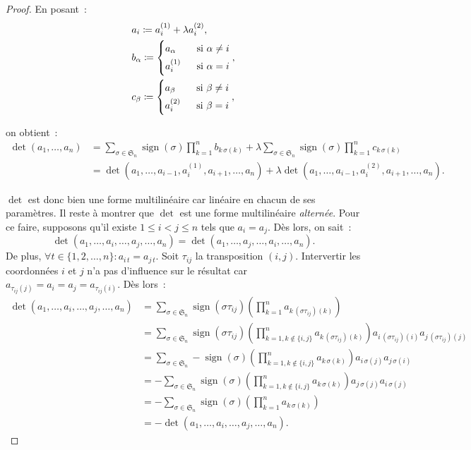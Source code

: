 \documentclass{article}
\DeclareMathOperator{\sign}{sign}
\newcommand{\Perm}{\mathfrak{S}}
\theoremstyle{definition}
\theoremstyle{remark}
\begin{document}
\begin{proof}
		En posant~:
		\[\begin{aligned}
			&a_i \coloneqq a_i^{(1)} + \lambda a_i^{(2)}, \\
			&b_\alpha \coloneqq \begin{dcases}a_\alpha \; &\text{ si } \alpha \neq i\\a_i^{(1)} \; &\text{ si } \alpha = i\end{dcases}, \\
			&c_\beta  \coloneqq \begin{dcases}a_\beta  \; &\text{ si } \beta  \neq i\\a_i^{(2)} \; &\text{ si } \beta  = i\end{dcases},
		\end{aligned}\]

		on obtient~:
		\[\begin{aligned}
			\det(a_1, \ldots, a_n) &= \sum_{\sigma\in\Perm_n}\sign(\sigma)\prod_{k=1}^nb_{k\,\sigma(k)} + \lambda\sum_{\sigma\in\Perm_n}\sign(\sigma)\prod_{k=1}^nc_{k\,\sigma(k)} \\
			                       &= \det(a_1, \ldots, a_{i-1}, a_i^{(1)}, a_{i+1}, \ldots, a_n) + \lambda\det(a_1, \ldots, a_{i-1}, a_i^{(2)}, a_{i+1}, \ldots, a_n).
		\end{aligned}\]

		$\det$ est donc bien une forme multilinéaire car linéaire en chacun de ses paramètres. Il reste à montrer que $\det$ est une forme multilinéaire \textit{alternée}.
		Pour ce faire, supposons qu'il existe $1 \leq i < j \leq n$ tels que $a_i = a_j$. Dès lors, on sait~:
		\[\det(a_1, \ldots, a_i, \ldots, a_j, \ldots, a_n) = \det(a_1, \ldots, a_j, \ldots, a_i, \ldots, a_n).\]
		De plus, $\forall t \in \{1, 2, \ldots, n\} : a_{i\,t} = a_{j\,t}$. Soit $\tau_{ij}$ la transposition $(i, j)$. Intervertir les coordonnées $i$ et $j$ n'a pas d'influence
		sur le résultat car $a_{\tau_{ij}(j)} = a_i = a_j = a_{\tau_{ij}(i)}$. Dès lors~:
		\[\begin{aligned}
			\det(a_1, \ldots, a_i, \ldots, a_j, \ldots, a_n) &= \sum_{\sigma \in \Perm_n}\sign(\sigma\tau_{ij})\left(\prod_{k=1}^na_{k\,(\sigma\tau_{ij})(k)}\right) \\
				&= \sum_{\sigma\in\Perm_n}\sign(\sigma\tau_{ij})\left(\prod_{k=1, k \not \in \{i, j\}}^na_{k\,(\sigma\tau_{ij})(k)}\right)a_{i\,(\sigma\tau_{ij})(i)}a_{j\,(\sigma\tau_{ij})(j)} \\
				&= \sum_{\sigma\in\Perm_n}-\sign(\sigma)\left(\prod_{k=1, k\not\in\{i, j\}}^na_{k\,\sigma(k)}\right)a_{i\,\sigma(j)}a_{j\,\sigma(i)} \\
				&= -\sum_{\sigma\in\Perm_n}\sign(\sigma)\left(\prod_{k=1, k\not\in\{i, j\}}^na_{k\,\sigma(k)}\right)a_{j\,\sigma(j)}a_{i\,\sigma(j)} \\
				&= -\sum_{\sigma\in\Perm_n}\sign(\sigma)\left(\prod_{k=1}^na_{k\,\sigma(k)}\right) \\
				&= -\det(a_1, \ldots, a_i, \ldots, a_j, \ldots, a_n).
		\end{aligned}\]


\end{proof}
\end{document}

